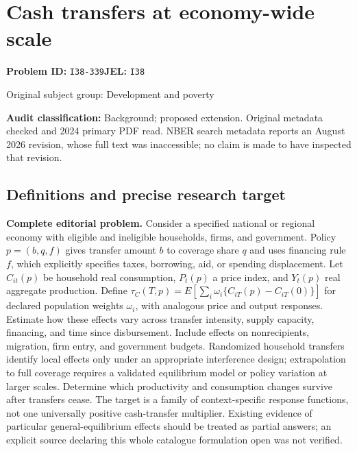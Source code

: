 \documentclass[11pt,a4paper]{article}
\begin{document}
\section*{Cash transfers at economy-wide scale}
\textbf{Problem ID:} \texttt{I38-339}\quad \textbf{JEL:} \texttt{I38}\par
\label{problem:OP-0372}
{\sffamily\small\color{muted}Original subject group: Development and poverty\par}
\label{definitions:problem:30007654}
\textbf{Audit classification:} Background; proposed extension. Original metadata checked and 2024 primary PDF read. NBER search metadata reports an August 2026 revision, whose full text was inaccessible; no claim is made to have inspected that revision.
\subsection*{Definitions and precise research target}
\textbf{Complete editorial problem.} Consider a specified national or regional economy with eligible and ineligible households, firms, and government. Policy \(p=(b,q,f)\) gives transfer amount \(b\) to coverage share \(q\) and uses financing rule \(f\), which explicitly specifies taxes, borrowing, aid, or spending displacement. Let \(C_{it}(p)\) be household real consumption, \(P_t(p)\) a price index, and \(Y_t(p)\) real aggregate production. Define \(\tau_C(T,p)=E[\sum_i\omega_i\{C_{iT}(p)-C_{iT}(0)\}]\) for declared population weights \(\omega_i\), with analogous price and output responses. Estimate how these effects vary across transfer intensity, supply capacity, financing, and time since disbursement. Include effects on nonrecipients, migration, firm entry, and government budgets. Randomized household transfers identify local effects only under an appropriate interference design; extrapolation to full coverage requires a validated equilibrium model or policy variation at larger scales. Determine which productivity and consumption changes survive after transfers cease. The target is a family of context-specific response functions, not one universally positive cash-transfer multiplier. Existing evidence of particular general-equilibrium effects should be treated as partial answers; an explicit source declaring this whole catalogue formulation open was not verified.
\end{document}
